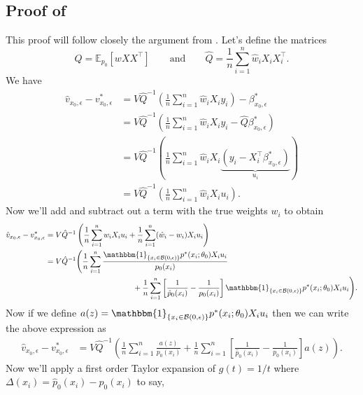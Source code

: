 \documentclass[11pt]{article}
\begin{document}
\subsection{Proof of } \label{sec: proof of velocity decomp}
This proof will follow closely the argument from \citet{Newey_Ruud_2005}. Let's define the matrices
\begin{equation*}
    Q = \mathbb{E}_{p_0}\left[wXX^{\top}\right] \qquad \text{and} \qquad \hat{Q} = \frac{1}{n}\sum_{i = 1}^n\hat{w}_iX_iX_i^{\top}.
\end{equation*}
We have
\begin{align*}
    \hat{v}_{x_0, \epsilon} - v^*_{x_0, \epsilon} &= V\hat{Q}^{-1}\left(\frac{1}{n}\sum_{i = 1}^n\hat{w}_iX_iy_i\right) - \beta^*_{x_0, \epsilon} \\
    &= V\hat{Q}^{-1}\left(\frac{1}{n}\sum_{i = 1}^n\hat{w}_iX_iy_i - \hat{Q}\beta^*_{x_0, \epsilon}\right) \\
    &= V\hat{Q}^{-1}\left(\frac{1}{n}\sum_{i = 1}^n\hat{w}_iX_i\underbrace{\left(y_i - X_i^{\top}\beta^*_{x_0, \epsilon}\right)}_{u_i}\right) \\
    &= V\hat{Q}^{-1}\left(\frac{1}{n}\sum_{i = 1}^n\hat{w}_iX_iu_i\right).
\end{align*}
Now we'll add and subtract out a term with the true weights $w_i$ to obtain
\begin{align*}
    \hat{v}_{x_0, \epsilon} - v^*_{x_0, \epsilon} &= V\hat{Q}^{-1}\left(\frac{1}{n}\sum_{i = 1}^nw_iX_iu_i + \frac{1}{n}\sum_{i = 1}^n(\hat{w}_i - w_i)X_iu_i\right) \\
    &= V\hat{Q}^{-1}\Bigg(\frac{1}{n}\sum_{i = 1}^n\frac{\mathbbm{1}_{\{x_i \in \mathcal{B}(0, \epsilon)\}}p^*(x_i;\theta_0)X_iu_i}{p_0(x_i)} \\
    &\hspace{40mm}+ \frac{1}{n}\sum_{i = 1}^n\left[\frac{1}{\hat{p}_0(x_i)} - \frac{1}{p_0(x_i)}\right]\mathbbm{1}_{\{x_i \in \mathcal{B}(0, \epsilon)\}}p^*(x_i;\theta_0)X_iu_i\Bigg).
\end{align*}
Now if we define $a(z) = \mathbbm{1}_{\{x_i \in \mathcal{B}(0, \epsilon)\}}p^*(x_i;\theta_0)X_iu_i$ then we can write the above expression as
\begin{align*}
    \hat{v}_{x_0, \epsilon} - v^*_{x_0, \epsilon} &= V\hat{Q}^{-1}\left(\frac{1}{n}\sum_{i = 1}^n\frac{a(z)}{p_0(x_i)} + \frac{1}{n}\sum_{i = 1}^n\left[\frac{1}{\hat{p}_0(x_i)} - \frac{1}{p_0(x_i)}\right]a(z)\right).
\end{align*}
Now we'll apply a first order Taylor expansion of $g(t) = 1/t$ where $\Delta(x_i) = \hat{p}_0(x_i) - p_0(x_i)$ to say,
\end{document}
